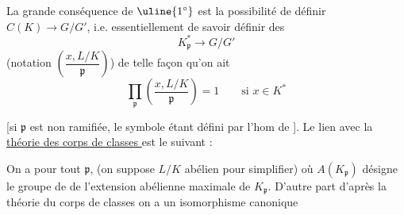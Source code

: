 La grande conséquence de $\uline{1^\circ}$ est la possibilité de définir $C(K)\longrightarrow G/G'$, i.e. essentiellement de savoir définir des 
\[
\boxed{K_{\mathfrak p}^*\longrightarrow G/G'}
\]
(notation $\left(\dfrac{x,L/K}{\mathfrak p}\right)$) de telle façon qu'on ait
\[
\boxed{\prod_{\mathfrak p}\left(\frac{x,L/K}{\mathfrak p}\right)=1\qquad\text{si }x\in K^*}
\]

[si $\mathfrak p$ est non ramifiée, le symbole     étant défini par l'hom de ]. Le lien avec la \uline{théorie des corps de classes } est le suivant :

On a pour tout $\mathfrak p$, 
(on suppose $L/K$ abélien pour simplifier) où $A(K_{\mathfrak p})$ désigne le groupe de  de l'extension abélienne maximale de $K_{\mathfrak p}$. D'autre part d'après la théorie du corps de classes  on a un isomorphisme canonique
